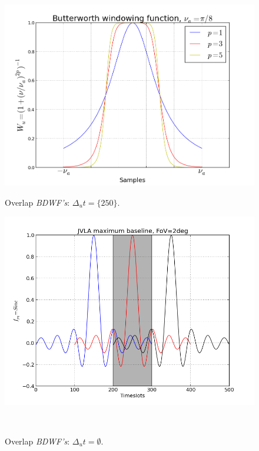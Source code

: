 \documentclass[useAMS,usenatbib]{mn2e}
\begin{document}
\begin{figure}
\begin{minipage}{0.38\linewidth}\includegraphics[width=1\textwidth]{./Figures/Butterwordth.png}\caption{Overlap 
		\textit{BDWF's}: $\Delta_u t=\{250\}$.}\label{fig:fig_4}\end{minipage}
\begin{minipage}{0.38\linewidth}\includegraphics[width=1\textwidth]{./Figures/corrSigVLAMxBl_overlapGdelta.png}\caption{Overlap 
		\textit{BDWF's}: $\Delta_u t=\emptyset$.}\label{fig:fig_5}\end{minipage}\
\end{figure}
\end{document}
